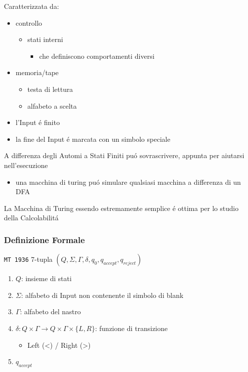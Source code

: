 \documentclass[
                        12pt, %
                        a4paper, %
                        oneside, %
                        headinclude,footinclude, %
                        BCOR5mm, %
                  ]{scrartcl}
\begin{document}
Caratterizzata da:
\begin{itemize}
\item controllo
\begin{itemize}
\item stati interni
\begin{itemize}
\item che definiscono comportamenti diversi
\end{itemize}
\end{itemize}
\item memoria/tape
\begin{itemize}
\item testa di lettura
\item alfabeto a scelta
\end{itemize}

\item l'Input é finito
\item la fine del Input é marcata con un simbolo speciale
\end{itemize}

A differenza degli Automi a Stati Finiti puó sovrascrivere, appunta per aiutarsi nell'esecuzione
\begin{itemize}
\item una macchina di turing puó simulare qualsiasi macchina a differenza di un DFA
\end{itemize}
La Macchina di Turing essendo estremamente semplice é ottima per lo studio della Calcolabilitá

\subsubsection{Definizione Formale}
\label{sec:org39af058}
\texttt{MT 1936}
7-tupla \((Q,\Sigma,\Gamma,\delta,q_0,q_{accept},q_{reject})\)
\begin{enumerate}
\item \(Q\): insieme di stati
\item \(\Sigma\): alfabeto di Input non contenente il simbolo di blank
\item \(\Gamma\): alfabeto del nastro
\item \(\delta: Q \times \Gamma \rightarrow Q \times \Gamma \times \{L,R\}\): funzione di transizione
\begin{itemize}
\item Left (<) / Right (>)
\end{itemize}
\item \(q_{accept}\)
\end{enumerate}
\end{document}
